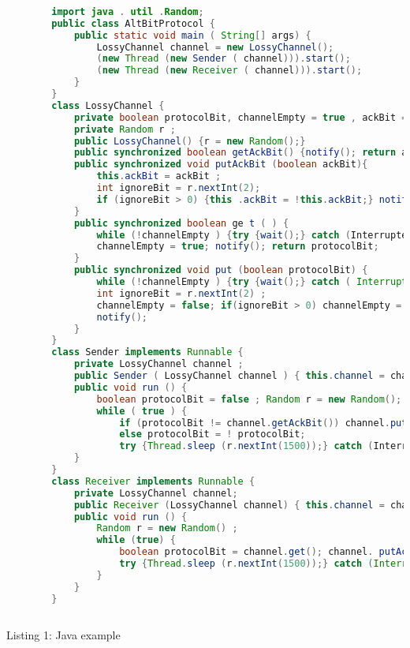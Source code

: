 \documentclass{article}
\begin{document}
	
	\begin{lstlisting}[language=Java]
		
		import java . util .Random;
		public class AltBitProtocol {
			public static void main ( String[] args) {
				LossyChannel channel = new LossyChannel();
				(new Thread (new Sender ( channel))).start();
				(new Thread (new Receiver ( channel))).start();
			}
		}
		class LossyChannel {
			private boolean protocolBit, channelEmpty = true , ackBit = true;
			private Random r ;
			public LossyChannel() {r = new Random();}
			public synchronized boolean getAckBit() {notify(); return ackBit;}
			public synchronized void putAckBit (boolean ackBit){
				this.ackBit = ackBit ;
				int ignoreBit = r.nextInt(2);
				if (ignoreBit > 0) {this .ackBit = !this.ackBit;} notify();
			}
			public synchronized boolean ge t ( ) {
				while (!channelEmpty ) {try {wait();} catch (InterruptedExceptione){}}
				channelEmpty = true; notify(); return protocolBit;
			}
			public synchronized void put (boolean protocolBit) {
				while (!channelEmpty ) {try {wait();} catch ( InterruptedException e){}}
				int ignoreBit = r.nextInt(2) ;
				channelEmpty = false; if(ignoreBit > 0) channelEmpty = true ;
				notify();
			}
		}
		class Sender implements Runnable {
			private LossyChannel channel ;
			public Sender ( LossyChannel channel ) { this.channel = channel; }
			public void run () {
				boolean protocolBit = false ; Random r = new Random();
				while ( true ) {
					if (protocolBit != channel.getAckBit()) channel.put (protocolBit);
					else protocolBit = ! protocolBit;
					try {Thread.sleep (r.nextInt(1500));} catch (InterruptedExption e){}}
			}
		}
		class Receiver implements Runnable {
			private LossyChannel channel;
			public Receiver (LossyChannel channel) { this.channel = channel;}
			public void run () {
				Random r = new Random() ;
				while (true) {
					boolean protocolBit = channel.get(); channel. putAckBit (protocolBit) ;
					try {Thread.sleep (r.nextInt(1500));} catch (InterruptedException e){}
				}
			}
		}
		
	\end{lstlisting}
	\begin{center}
		Listing 1: Java example
	\end{center}
\end{document}
